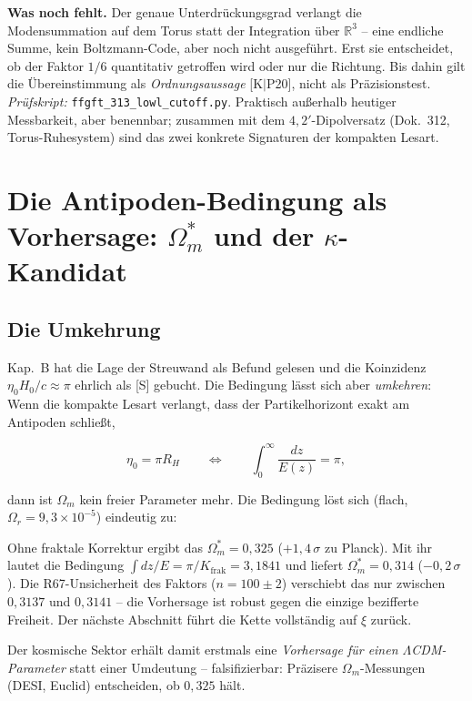 \documentclass[11pt]{report}
\begin{document}
\textbf{Was noch fehlt.} Der genaue Unterdrückungsgrad verlangt
die Modensummation auf dem Torus statt der Integration über
$\mathbb{R}^3$ -- eine endliche Summe, kein Boltzmann-Code, aber
noch nicht ausgeführt. Erst sie entscheidet, ob der Faktor $1/6$
quantitativ getroffen wird oder nur die Richtung. Bis dahin gilt
die Übereinstimmung als \emph{Ordnungsaussage} [K$|$P20], nicht
als Präzisionstest. \emph{Prüfskript:}
\texttt{ffgft\_313\_lowl\_cutoff.py}. Praktisch außerhalb heutiger
Messbarkeit, aber benennbar; zusammen mit dem
$4{,}2'$-Dipolversatz (Dok.~312, Torus-Ruhesystem) sind das zwei
konkrete Signaturen der kompakten Lesart.

\chapter{Die Antipoden-Bedingung als Vorhersage:
$\Omega_m^{*}$ und der $\kappa$-Kandidat}

\section{Die Umkehrung}

Kap.~B hat die Lage der Streuwand als Befund gelesen und die
Koinzidenz $\eta_0 H_0/c \approx \pi$ ehrlich als [S] gebucht.
Die Bedingung lässt sich aber \emph{umkehren}: Wenn die kompakte
Lesart verlangt, dass der Partikelhorizont exakt am Antipoden
schließt,

\begin{equation}
  \eta_0 = \pi R_H
  \qquad\Longleftrightarrow\qquad
  \int_0^\infty \frac{dz}{E(z)} = \pi,
\end{equation}

dann ist $\Omega_m$ kein freier Parameter mehr. Die Bedingung
löst sich (flach, $\Omega_r = 9{,}3\times10^{-5}$) eindeutig zu:

Ohne fraktale Korrektur ergibt das
$\Omega_m^{*} = 0{,}325$ ($+1{,}4\,\sigma$ zu Planck). Mit ihr
lautet die Bedingung $\int dz/E = \pi/K_\text{frak} = 3{,}1841$
und liefert $\Omega_m^{*} = 0{,}314$ ($-0{,}2\,\sigma$). Die
R67-Unsicherheit des Faktors ($n = 100\pm2$) verschiebt das nur
zwischen $0{,}3137$ und $0{,}3141$ -- die Vorhersage ist robust
gegen die einzige bezifferte Freiheit. Der nächste Abschnitt führt
die Kette vollständig auf $\xi$ zurück.

Der kosmische Sektor erhält damit erstmals eine \emph{Vorhersage
für einen $\Lambda$CDM-Parameter} statt einer Umdeutung --
falsifizierbar: Präzisere $\Omega_m$-Messungen (DESI, Euclid)
entscheiden, ob $0{,}325$ hält.
\end{document}
